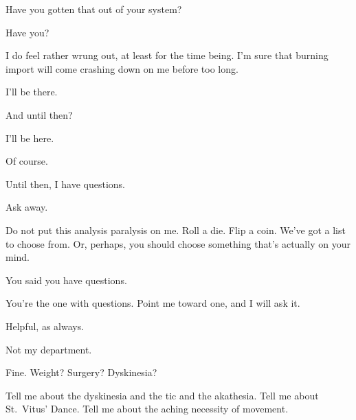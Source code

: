 \noindent Have you gotten that out of your system?

\begin{ally}
Have you?
\end{ally}
I do feel rather wrung out, at least for the time being. I'm sure that burning import will come crashing down on me before too long.

\begin{ally}
I'll be there.
\end{ally}
And until then?

\begin{ally}
I'll be here.
\end{ally}
Of course.

\begin{ally}
Until then, I have questions.
\end{ally}
Ask away.

\begin{ally}
Do not put this analysis paralysis on me. Roll a die. Flip a coin. We've got a list to choose from. Or, perhaps, you should choose something that's actually on your mind.
\end{ally}
You said you have questions.

\begin{ally}
You're the one with questions. Point me toward one, and I will ask it.
\end{ally}
Helpful, as always.

\begin{ally}
Not my department.
\end{ally}
Fine. Weight? Surgery? Dyskinesia?

\begin{ally}
Tell me about the dyskinesia and the tic and the akathesia. Tell me about St.~Vitus' Dance. Tell me about the aching necessity of movement.
\end{ally}
\newpage
